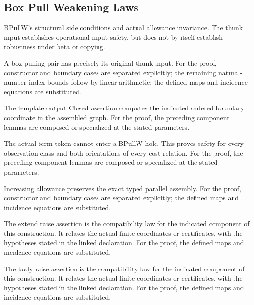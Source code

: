 \subsection{Box Pull Weakening Laws}
BPullW's structural side conditions and actual allowance invariance. The thunk input establishes operational input safety, but does not by itself establish robustness under beta or copying.

A box-pulling pair has precisely its original thunk input.
For the proof, constructor and boundary cases are separated explicitly; the remaining natural-number index bounds follow by linear arithmetic; the defined maps and incidence equations are substituted.
\par{}

The template output Closed assertion computes the indicated ordered boundary coordinate in the assembled graph.
For the proof, the preceding component lemmas are composed or specialized at the stated parameters.
\par{}

The actual term token cannot enter a BPullW hole. This proves safety for every observation class and both orientations of every cost relation.
For the proof, the preceding component lemmas are composed or specialized at the stated parameters.
\par{}

Increasing allowance preserves the exact typed parallel assembly.
For the proof, constructor and boundary cases are separated explicitly; the defined maps and incidence equations are substituted.
\par{}

The extend raise assertion is the compatibility law for the indicated component of this construction. It relates the actual finite coordinates or certificates, with the hypotheses stated in the linked declaration.
For the proof, the defined maps and incidence equations are substituted.
\par{}

The body raise assertion is the compatibility law for the indicated component of this construction. It relates the actual finite coordinates or certificates, with the hypotheses stated in the linked declaration.
For the proof, the defined maps and incidence equations are substituted.
\par{}

